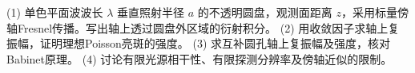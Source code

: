 (1) 单色平面波波长 \(\lambda\) 垂直照射半径 \(a\) 的不透明圆盘，观测面距离 \(z\)，采用标量傍轴Fresnel传播。写出轴上透过圆盘外区域的衍射积分。
(2) 用收敛因子求轴上复振幅，证明理想Poisson亮斑的强度。
(3) 求互补圆孔轴上复振幅及强度，核对Babinet原理。
(4) 讨论有限光源相干性、有限探测分辨率及傍轴近似的限制。
